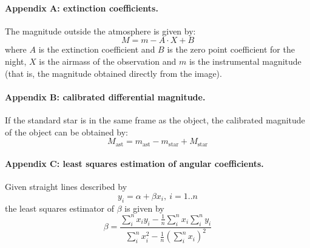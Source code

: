 \paragraph{Appendix A: extinction coefficients.}
The magnitude outside the atmosphere is given by:
\[ M = m - A\cdot X + B \]
where $A$ is the extinction coefficient and $B$ is the zero point coefficient
for the night, $X$ is the airmass of the observation and $m$ is the
instrumental magnitude (that is, the magnitude obtained directly from the
image).

\paragraph{Appendix B: calibrated differential magnitude.}
If the standard star is in the same frame as the object, the calibrated
magnitude of the object can be obtained by:
\[ M_{\mathrm{ast}} = m_{\mathrm{ast}} - m_{\mathrm{star}}
   + M_{\mathrm{star}} \]

\paragraph{Appendix C: least squares estimation of angular coefficients.}
Given straight lines described by
\[ y_i = \alpha + \beta x_i,\ i = 1..n \]
the least squares estimator of $\beta$ is given by
\[ \beta = \frac{\sum_i^n x_i y_i - \frac{1}{n}\sum_i^n x_i \sum_i^n y_i}
   {\sum_i^n x_i^2 - \frac{1}{n}\left(\sum_i^n x_i\right)^2} \]
